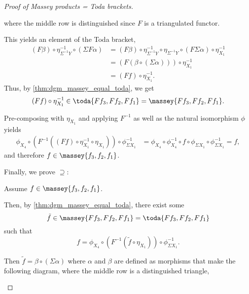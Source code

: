 \begin{proof}[Proof of Massey products = Toda brackets]
\begin{center}
    \end{center}

    where the middle row is distinguished since \( F \) is a triangulated functor.

    This yields an element of the Toda bracket,
    \begin{align*}
        (F \beta) \circ \eta^{-1}_{\Sigma^{-1} Y} \circ (\Sigma F \alpha) &= (F \beta) \circ \eta^{-1}_{\Sigma^{-1} Y} \circ \eta_{\Sigma^{-1} Y} \circ (F \Sigma \alpha) \circ \eta^{-1}_{X_1} \\
        &= (F (\beta \circ (\Sigma \alpha))) \circ \eta^{-1}_{X_1} \\
        &= (F f ) \circ \eta^{-1}_{X_1}.
    \end{align*}
    Thus, by \autoref{thm:dgm_massey_equal_toda}, we get
    \[
        (F f ) \circ \eta^{-1}_{X_1} \in \toda{F f_3, F f_2, F f_1} = \massey{F f_3, F f_2, F f_1}.
    \]

    Pre-composing with \( \eta_{X_1} \) and applying \( F^{-1} \) as well as the natural isomorphism \( \phi \) yields
    \begin{align*}
        \phi_{X_4} \circ (F^{-1} ((F f ) \circ \eta^{-1}_{X_1} \circ \eta_{X_1})) \circ \phi^{-1}_{\Sigma X_1} &= \phi_{X_4} \circ \phi^{-1}_{X_4} \circ f \circ \phi_{\Sigma X_1} \circ \phi^{-1}_{\Sigma X_1} = f,
    \end{align*}
    and therefore \( f \in \massey{f_3, f_2, f_1} \).

    Finally, we prove \( \supseteq \):

    Assume \( f \in \massey{f_3, f_2, f_1} \).

    Then, by \autoref{thm:dgm_massey_equal_toda}, there exist some
    \[
        \tilde{f} \in \massey{F f_3, F f_2, F f_1} = \toda{F f_3, F f_2, F f_1}
    \]
    such that
    \[
        f = \phi_{X_4} \circ (F^{-1} (\tilde{f} \circ \eta_{X_1})) \circ \phi^{-1}_{\Sigma X_1}.
    \]

    Then \( \tilde{f} = \beta \circ (\Sigma \alpha) \) where \( \alpha \) and \( \beta \) are defined as morphisms that make the following diagram, where the middle row is a distinguished triangle,
    \begin{center}
\end{center}
\end{proof}
